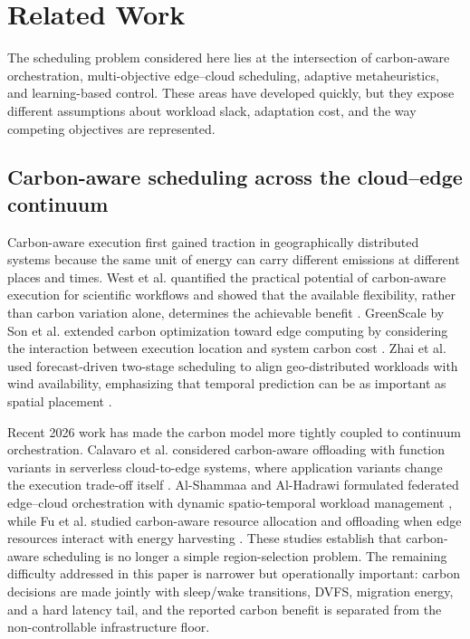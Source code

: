 \section{Related Work}
\label{sec:related}

The scheduling problem considered here lies at the intersection of carbon-aware orchestration, multi-objective edge--cloud scheduling, adaptive metaheuristics, and learning-based control. These areas have developed quickly, but they expose different assumptions about workload slack, adaptation cost, and the way competing objectives are represented.

\subsection{Carbon-aware scheduling across the cloud--edge continuum}

Carbon-aware execution first gained traction in geographically distributed systems because the same unit of energy can carry different emissions at different places and times. West et al. quantified the practical potential of carbon-aware execution for scientific workflows and showed that the available flexibility, rather than carbon variation alone, determines the achievable benefit \cite{West2026CarbonAwareWorkflows}. GreenScale by Son et al. extended carbon optimization toward edge computing by considering the interaction between execution location and system carbon cost \cite{son2025greenscale}. Zhai et al. used forecast-driven two-stage scheduling to align geo-distributed workloads with wind availability, emphasizing that temporal prediction can be as important as spatial placement \cite{zhai2025forecast}.

Recent 2026 work has made the carbon model more tightly coupled to continuum orchestration. Calavaro et al. considered carbon-aware offloading with function variants in serverless cloud-to-edge systems, where application variants change the execution trade-off itself \cite{calavaro2026functionvariants}. Al-Shammaa and Al-Hadrawi formulated federated edge--cloud orchestration with dynamic spatio-temporal workload management \cite{alshammaa2026federated}, while Fu et al. studied carbon-aware resource allocation and offloading when edge resources interact with energy harvesting \cite{fu2026ehcarbon}. These studies establish that carbon-aware scheduling is no longer a simple region-selection problem. The remaining difficulty addressed in this paper is narrower but operationally important: carbon decisions are made jointly with sleep/wake transitions, DVFS, migration energy, and a hard latency tail, and the reported carbon benefit is separated from the non-controllable infrastructure floor.

